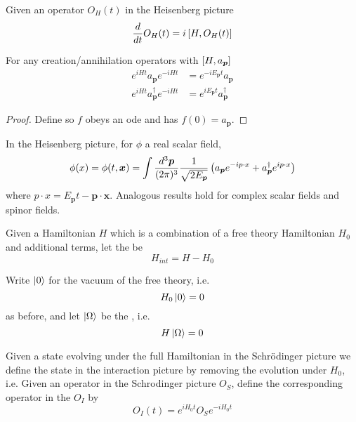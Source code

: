 \documentclass{article}
\begin{document}
\begin{theorem}
Given an operator $O_H(t)$ in the Heisenberg picture 
\[
\frac{d}{dt} O_H(t) = i \comm[H]{O_H(t)}
\]
\end{theorem}

\begin{theorem}
For any creation/annihilation operators with $\comm[H]{a_{\bm{p}}}$
\begin{align*}
e^{iHt} a_{\bm{p}}  e^{-iHt} &= e^{-iE_{\bm{p}}t} a_{\bm{p}} \\
e^{iHt} a_{\bm{p}}^\dagger  e^{-iHt} &= e^{iE_{\bm{p}}t} a_{\bm{p}}^\dagger
\end{align*}
\end{theorem}
\begin{proof}
Define 
so $f$ obeys an ode and has $f(0) = a_{\bm{p}}$. 
\end{proof}

\begin{theorem}
In the Heisenberg picture, for $\phi$ a real scalar field, 
\[
\phi(x)=\phi(t,\bm{x}) = \int\tmeas  \frac{1}{\sqrt{2E_{\bm{p}}}} \left( a_{\bm{p}} e^{-i p\cdot x} + a_{\bm{p}}^\dagger e^{i p\cdot x} \right)
\]
where $p\cdot x = E_{\bm{p}}t-\bm{p}\cdot\bm{x}$. Analogous results hold for complex scalar fields and spinor fields. 
\end{theorem} 

\begin{definition}
Given a Hamiltonian $H$ which is a combination of a free theory Hamiltonian $H_0$ and additional terms, let the  be 
\[
H_{int} = H - H_0
\]
\end{definition}

\begin{definition}
Write $\ket{0}$ for the vacuum of the free theory, i.e. 
\[
H_0 \ket{0} = 0
\]
as before, and let $\ket{\Omega}$ be the , i.e. \[
H \ket{\Omega} = 0
\]
\end{definition}

\begin{definition}
Given a state evolving under the full Hamiltonian in the Schr\"odinger picture 
we define the state in the interaction picture by removing the evolution under $H_0$, i.e. 
Given an operator in the Schrodinger picture $O_S$, define the corresponding operator in the  $O_I$ by 
\[
O_I(t) = e^{iH_0t} O_S e^{-iH_0t}
\]
\end{definition}
\end{document}
